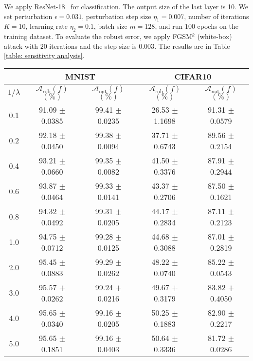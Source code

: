 \documentclass[11pt]{article}
\newcommand{\adv}{\mathrm{rob}}
\newcommand{\nat}{\mathrm{nat}}
\newcommand{\0}{\mathbf{0}}
\newcommand{\1}{\mathbf{1}}
\newcommand{\cA}{\mathcal{A}}
\begin{document}
\medskip
{} We apply ResNet-18~\cite{he2016deep} for classification. The output size of the last layer is 10. We set perturbation $\epsilon = 0.031$, perturbation step size $\eta_1 = 0.007$, number of iterations $K = 10$, learning rate $\eta_2 = 0.1$, batch size $m = 128$, and run $100$ epochs on the training dataset. To evaluate the robust error, we apply FGSM$^k$ (white-box) attack with $20$ iterations and the step size is $0.003$. The results are in Table \ref{table: sensitivity analysis}.

\begin{table*}
	\caption{Sensitivity of regularization hyperparameter $\lambda$ on MNIST and CIFAR10 datasets.}
	\label{table: sensitivity analysis}
	\centering
\begin{tabular}{c|cc||cc}\hline
		& \multicolumn{2}{c}{MNIST} & \multicolumn{2}{c}{CIFAR10}\\
		\hline
		$1/\lambda$ & $\cA_\adv(f)$ $(\%)$   & $\cA_\nat(f)$  $(\%)$ & $\cA_\adv(f)$ $(\%)$ & $\cA_\nat(f)$  $(\%)$\\
		\hline
		0.1 & 91.09 $\pm$ 0.0385 & 99.41 $\pm$ 0.0235 & 26.53 $\pm$ 1.1698 & 91.31 $\pm$ 0.0579 \\
		0.2 & 92.18 $\pm$ 0.0450 & 99.38 $\pm$ 0.0094 & 37.71 $\pm$ 0.6743 & 89.56 $\pm$ 0.2154\\
		0.4 & 93.21 $\pm$ 0.0660 & 99.35 $\pm$ 0.0082 & 41.50 $\pm$ 0.3376 & 87.91 $\pm$ 0.2944\\
		0.6 & 93.87 $\pm$ 0.0464 & 99.33 $\pm$ 0.0141 & 43.37 $\pm$ 0.2706 & 87.50 $\pm$ 0.1621\\
		0.8 & 94.32 $\pm$ 0.0492 & 99.31 $\pm$ 0.0205 & 44.17 $\pm$ 0.2834 & 87.11 $\pm$ 0.2123\\
		1.0 & 94.75 $\pm$ 0.0712 & 99.28 $\pm$ 0.0125 & 44.68 $\pm$ 0.3088 & 87.01 $\pm$ 0.2819\\
		2.0 & 95.45 $\pm$ 0.0883 & 99.29 $\pm$ 0.0262 & 48.22 $\pm$ 0.0740 & 85.22 $\pm$ 0.0543\\
		3.0 & 95.57 $\pm$ 0.0262 & 99.24 $\pm$ 0.0216 & 49.67 $\pm$ 0.3179 & 83.82 $\pm$ 0.4050\\
		4.0 & 95.65 $\pm$ 0.0340 & 99.16 $\pm$ 0.0205 & 50.25 $\pm$ 0.1883 & 82.90 $\pm$ 0.2217\\
		5.0 & 95.65 $\pm$ 0.1851 & 99.16 $\pm$ 0.0403 & 50.64 $\pm$ 0.3336 & 81.72 $\pm$ 0.0286\\
		\hline
	\end{tabular}
\end{table*}
\end{document}
